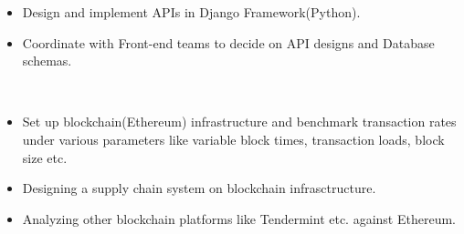 \documentclass[10pt,a4paper,ragged2e]{altacv}
\begin{document}

\begin{fullwidth}
\makecvheader
\end{fullwidth}



\begin{itemize}
    \item Design and implement APIs in Django Framework(Python).
    \item Coordinate with Front-end teams to decide on API designs and Database schemas.
\end{itemize}

\divider
\\
\begin{itemize}
\item Set up blockchain(Ethereum) infrastructure and benchmark transaction rates under various parameters like variable block times, transaction loads, block size etc.
\item Designing a supply chain system on blockchain infrasctructure.
\item Analyzing other blockchain platforms like Tendermint etc. against Ethereum.
\end{itemize}
\end{document}
